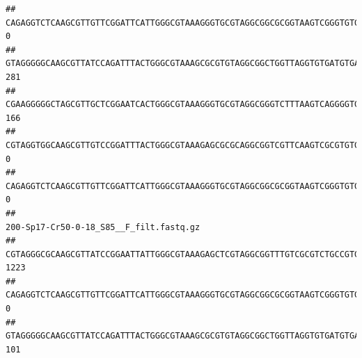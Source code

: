 \documentclass[]{article}
\begin{document}
\begin{verbatim}
## CAGAGGTCTCAAGCGTTGTTCGGATTCATTGGGCGTAAAGGGTGCGTAGGCGGCGCGGTAAGTCGGGTGTGAAATCTCGGAGCTTAACTCCGAAACTGCATTCGATACTGCCGTGCTTGAGGACTGGAGAGGAGACTGGAATTTACGGTGTAGCGGTGAAATGCGTAGATATCGTAAGGAAGACCAGTGGCGAAGGCGGGTCTCTGGACAGTTCCTGACGCTGAGGCACGAAGGCCAGGGGAGCAAACG                                       0
## GTAGGGGGCAAGCGTTATCCAGATTTACTGGGCGTAAAGCGCGTGTAGGCGGCTGGTTAGGTGTGATGTGAAATCTTCCGGCTCAACCGGAAAACTGCATTGCAAACCGGCCTGGCTAGAGTGCAGGAGAGGGAAGCGGAATTCCAGGTGTAGCGGTGAAATGCGTAGATATCTGGAGGAACACCAGTGGCGAAGGCGGCTTCCTGGCCTGCAACTGACGCTGAGACGCGAAAGCGTGGGGAGCGAAC                                      281
## CGAAGGGGGCTAGCGTTGCTCGGAATCACTGGGCGTAAAGGGTGCGTAGGCGGGTCTTTAAGTCAGGGGTGAAATCCTGGAGCTCAACTCCAGAACTGCCTTTGATACTGAAGATCTTGAGTTCGGGAGAGGTGAGTGGAACTGCGAGTGTAGAGGTGAAATTCGTAGATATTCGCAAGAACACCAGTGGCGAAGGCGGCTCACTGGCCCGATACTGACGCTGAGGCACGAAAGCGTGGGGAGCAAACA                                     166
## CGTAGGTGGCAAGCGTTGTCCGGATTTACTGGGCGTAAAGAGCGCGCAGGCGGTCGTTCAAGTCGCGTGTGAAAGCCCCCGGCTCAACTGGGGAGGGTCACGCGATACTGATCGACTCGAAGGCAGGAGAGGGTAGTGGAATTCCCGGTGTAGTGGTGAAATGCGTAGATATCGGGAGGAACACCAGTGGCGAAGGCGACTACCTGGCCTGTTCTTGACGCTGAGGCGCGAAAGCTAGGGGAGCAAACG                                       0
## CAGAGGTCTCAAGCGTTGTTCGGATTCATTGGGCGTAAAGGGTGCGTAGGCGGCGCGGTAAGTCGGGTGTGAAATCTCGGGGCTTAACTCCGAAACTGCATTCGATACTGCCGTGCTTGAGGACTGGAGAGGAGACTGGAATTTACGGTGTAGCGGTGAAATGCGTAGATATCGTAAGGAAGACCAGTGGCGAAGGCGGGTCTCTGGACAGTTCCTGACGCTGAGGCACGAAGGCCAGGGGAGCAAACG                                       0
##                                                                                                                                                                                                                                                           200-Sp17-Cr50-0-18_S85__F_filt.fastq.gz
## CGTAGGGCGCAAGCGTTATCCGGAATTATTGGGCGTAAAGAGCTCGTAGGCGGTTTGTCGCGTCTGCCGTGAAAGTCCGGGGCTCAACTCCGGATCTGCGGTGGGTACGGGCAGACTAGAGTGATGTAGGGGAGACTGGAATTCCTGGTGTAGCGGTGAAATGCGCAGATATCAGGAGGAACACCGATGGCGAAGGCAGGTCTCTGGGCATTAACTGACGCTGAGGAGCGAAAGCATGGGGAGCGAACA                                    1223
## CAGAGGTCTCAAGCGTTGTTCGGATTCATTGGGCGTAAAGGGTGCGTAGGCGGCGCGGTAAGTCGGGTGTGAAATCTCGGAGCTTAACTCCGAAACTGCATTCGATACTGCCGTGCTTGAGGACTGGAGAGGAGACTGGAATTTACGGTGTAGCGGTGAAATGCGTAGATATCGTAAGGAAGACCAGTGGCGAAGGCGGGTCTCTGGACAGTTCCTGACGCTGAGGCACGAAGGCCAGGGGAGCAAACG                                       0
## GTAGGGGGCAAGCGTTATCCAGATTTACTGGGCGTAAAGCGCGTGTAGGCGGCTGGTTAGGTGTGATGTGAAATCTTCCGGCTCAACCGGAAAACTGCATTGCAAACCGGCCTGGCTAGAGTGCAGGAGAGGGAAGCGGAATTCCAGGTGTAGCGGTGAAATGCGTAGATATCTGGAGGAACACCAGTGGCGAAGGCGGCTTCCTGGCCTGCAACTGACGCTGAGACGCGAAAGCGTGGGGAGCGAAC                                      101

\end{verbatim}
\end{document}
